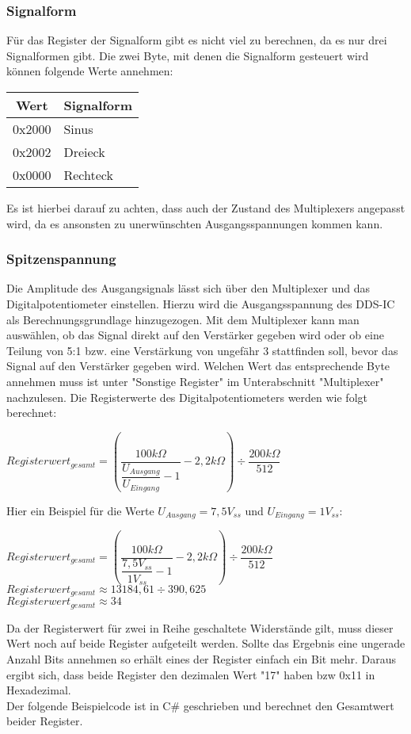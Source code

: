 \subsubsection*{Signalform}
Für das Register der Signalform gibt es nicht viel zu berechnen, da es nur drei Signalformen gibt. Die zwei Byte, mit denen die Signalform gesteuert wird können folgende Werte annehmen:
\begin{center}
\begin{tabular}{c||l}
Wert & Signalform \\
\hline
\hline
0x2000 & Sinus \\
\hline
0x2002 & Dreieck \\
\hline
0x0000 & Rechteck \\
\end{tabular}
\end{center}
Es ist hierbei darauf zu achten, dass auch der Zustand des Multiplexers angepasst wird, da es ansonsten zu unerwünschten Ausgangsspannungen kommen kann.
\subsubsection*{Spitzenspannung}
Die Amplitude des Ausgangsignals lässt sich über den Multiplexer und das Digitalpotentiometer einstellen. Hierzu wird die Ausgangsspannung des DDS-IC als Berechnungsgrundlage hinzugezogen. Mit dem Multiplexer kann man auswählen, ob das Signal direkt auf den Verstärker gegeben wird oder ob eine Teilung von 5:1 bzw. eine Verstärkung von ungefähr 3 stattfinden soll, bevor das Signal auf den Verstärker gegeben wird. Welchen Wert das entsprechende Byte annehmen muss ist unter "Sonstige Register" im Unterabschnitt "Multiplexer" nachzulesen. Die Registerwerte des Digitalpotentiometers werden wie folgt berechnet:\\

\begin{center}
$Registerwert_{gesamt} = (\dfrac{100k\Omega}{\dfrac{U_{Ausgang}}{U_{Eingang}}-1}-2,2k\Omega)\div \dfrac{200k\Omega}{512}$
\end{center}

Hier ein Beispiel für die Werte $U_{Ausgang}=7,5V_{ss}$ und $U_{Eingang}=1V_{ss}$:\\

\begin{center}
$Registerwert_{gesamt} = (\dfrac{100k\Omega}{\dfrac{7,5V_{ss}}{1V_{ss}}-1}-2,2k\Omega)\div \dfrac{200k\Omega}{512}$\\
\medskip
$Registerwert_{gesamt} \approx 13184,61\div 390,625$ \\
\medskip
$Registerwert_{gesamt} \approx 34$
\end{center}
Da der Registerwert für zwei in Reihe geschaltete Widerstände gilt, muss dieser Wert noch auf beide Register aufgeteilt werden. Sollte das Ergebnis eine ungerade Anzahl Bits annehmen so erhält eines der Register einfach ein Bit mehr. Daraus ergibt sich, dass beide Register den dezimalen Wert "17" haben bzw 0x11 in Hexadezimal.\\
Der folgende Beispielcode ist in C\# geschrieben und berechnet den Gesamtwert beider Register.

